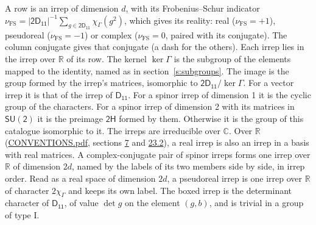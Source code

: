 \documentclass[10pt,a4paper]{article}
\numberwithin{equation}{section}
\newcommand{\grp}[1]{\mathsf{#1}}
\newcommand{\irchar}[1]{\chi_{#1}}
\newcommand{\fsind}{\nu_{\mathrm{FS}}}
\begin{document}
\leavevmode\label{n:index.frobenius}\label{n:head.irrep}\label{n:head.reality}A row is an irrep of dimension $d$, with its Frobenius--Schur indicator $\fsind = |\grp{2D_{11}}|^{-1}\allowbreak\sum_{g\in\grp{2D_{11}}}\irchar{\Gamma}(g^2)$, which gives its reality: real ($\fsind = +1$), pseudoreal ($\fsind = -1$) or complex ($\fsind = 0$, paired with its conjugate). \label{n:head.conjugate}The column conjugate gives that conjugate (a dash for the others). \label{n:head.over.real}Each irrep lies in the irrep over $\mathbb{R}$ of its row. \label{n:head.kernel}The kernel $\ker\Gamma$ is the subgroup of the elements mapped to the identity, named as in section~\ref{s:subgroups}. \label{n:head.image}The image is the group formed by the irrep's matrices, isomorphic to $\grp{2D_{11}}/\ker\Gamma$. For a vector irrep it is that of the irrep of \href{../../../rotation/data/pdf/D11.pdf}{$\grp{D_{11}}$}. For a spinor irrep of dimension 1 it is the cyclic group of the characters. For a spinor irrep of dimension 2 with its matrices in $\grp{SU(2)}$ it is the preimage $\grp{2H}$ formed by them. Otherwise it is the group of this catalogue isomorphic to it. The irreps are irreducible over $\mathbb{C}$. Over $\mathbb{R}$ (\href{../../CONVENTIONS.pdf}{CONVENTIONS.pdf}, sections \href{../../../rotation/CONVENTIONS.pdf\#conv.7}{7} and \href{../../CONVENTIONS.pdf\#conv.23.2}{23.2}), a real irrep is also an irrep in a basis with real matrices. A complex-conjugate pair of spinor irreps forms one irrep over $\mathbb{R}$ of dimension $2d$, named by the labels of its two members side by side, in irrep order. Read as a real space of dimension $2d$, a pseudoreal irrep is one irrep over $\mathbb{R}$ of character $2\irchar{\Gamma}$ and keeps its own label. \label{n:mark.determinant}The boxed irrep is the determinant character of \href{../../../rotation/data/pdf/D11.pdf}{$\grp{D_{11}}$}, of value $\det g$ on the element $(g, b)$, and is trivial in a group of type I.
\setlength{\emergencystretch}{2em}\par\setlength{\emergencystretch}{0pt}
\end{document}
